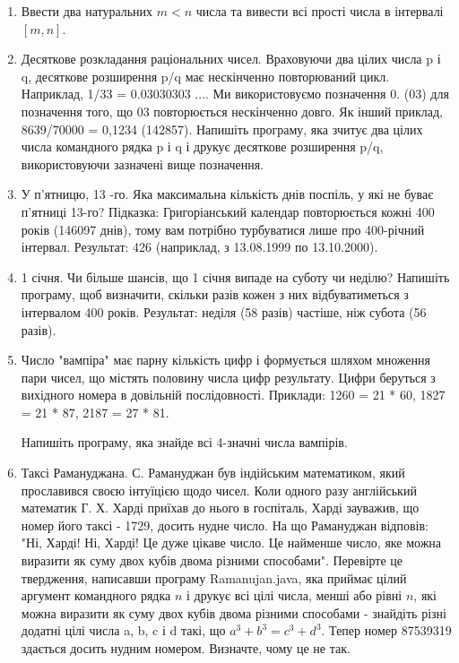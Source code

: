 \documentclass[]{article}
\begin{document}
\begin{enumerate}
\item
Ввести два натуральних $m<n$ числа та вивести всі прості числа в інтервалі $[m,n]$.

\item Десяткове розкладання раціональних чисел.
Враховуючи два цілих числа p і q, десяткове розширення p/q має нескінченно повторюваний цикл.
Наприклад, 1/33 = 0.03030303 .... Ми використовуємо позначення 0. (03) для позначення того, що 03 повторюється нескінченно довго.
Як інший приклад, 8639/70000 = 0,1234 (142857).
Напишіть програму, яка зчитує два цілих числа командного рядка p і q і друкує десяткове розширення p/q,
 використовуючи зазначені вище позначення. 

\item У п’ятницю, 13 -го. Яка максимальна кількість днів поспіль, у які не буває п’ятниці 13-го?
Підказка: Григоріанський календар повторюється кожні 400 років (146097 днів), тому вам потрібно турбуватися лише про 400-річний інтервал.
Результат: 426 (наприклад, з 13.08.1999 по 13.10.2000).
\item
 1 січня. Чи більше шансів, що 1 січня випаде на суботу чи неділю?
Напишіть програму, щоб визначити, скільки разів кожен з них відбуватиметься з інтервалом 400 років.
Результат: неділя (58 разів) частіше, ніж субота (56 разів).

\item
Число "вампіра" має парну кількість цифр і формується шляхом множення пари чисел, що містять половину числа цифр результату. Цифри беруться з вихідного номера в довільній послідовності. 
Приклади: 1260 = 21 * 60, 1827 = 21 * 87, 2187 = 27 * 81.

Напишіть програму, яка знайде всі 4-значні числа вампірів. 


\item Таксі Рамануджана. С. Рамануджан був індійським математиком, який прославився своєю інтуїцією щодо чисел.
 Коли одного разу англійський математик Г. Х. Харді приїхав до нього в госпіталь, Харді зауважив, що номер його таксі - 1729,
 досить нудне число. На що Рамануджан відповів: "Ні, Харді! Ні, Харді! Це дуже цікаве число.
Це найменше число, яке можна виразити як суму двох кубів двома різними способами".
Перевірте це твердження, написавши програму Ramanujan.java, яка приймає цілий аргумент командного рядка $n$ і друкує всі цілі числа,
 менші або рівні $n$, які можна виразити як суму двох кубів двома різними способами - знайдіть різні додатні цілі числа a, b, c і d такі,
 що $a^{3} + b^{3} = c^{3} + d^{3}$. 
Тепер номер 87539319 здається досить нудним номером. Визначте, чому це не так.

\end{enumerate}
\end{document}
